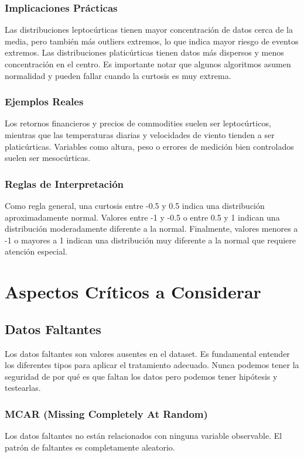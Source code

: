 \documentclass[12pt]{article}
\begin{document}
\subsubsection{Implicaciones Prácticas}
Las distribuciones leptocúrticas tienen mayor concentración de datos cerca de la media, pero también más outliers extremos, lo que indica mayor riesgo de eventos extremos. Las distribuciones platicúrticas tienen datos más dispersos y menos concentración en el centro. Es importante notar que algunos algoritmos asumen normalidad y pueden fallar cuando la curtosis es muy extrema.

\subsubsection{Ejemplos Reales}
Los retornos financieros y precios de commodities suelen ser leptocúrticos, mientras que las temperaturas diarias y velocidades de viento tienden a ser platicúrticas. Variables como altura, peso o errores de medición bien controlados suelen ser mesocúrticas.

\subsubsection{Reglas de Interpretación}
Como regla general, una curtosis entre -0.5 y 0.5 indica una distribución aproximadamente normal. Valores entre -1 y -0.5 o entre 0.5 y 1 indican una distribución moderadamente diferente a la normal. Finalmente, valores menores a -1 o mayores a 1 indican una distribución muy diferente a la normal que requiere atención especial.

\section{Aspectos Críticos a Considerar}

\subsection{Datos Faltantes}
Los datos faltantes son valores ausentes en el dataset. Es fundamental entender los diferentes tipos para aplicar el tratamiento adecuado. Nunca podemos tener la seguridad de por qué es que faltan los datos pero podemos tener hipótesis y testearlas.

\subsubsection{MCAR (Missing Completely At Random)}
Los datos faltantes no están relacionados con ninguna variable observable. El patrón de faltantes es completamente aleatorio.
\end{document}
